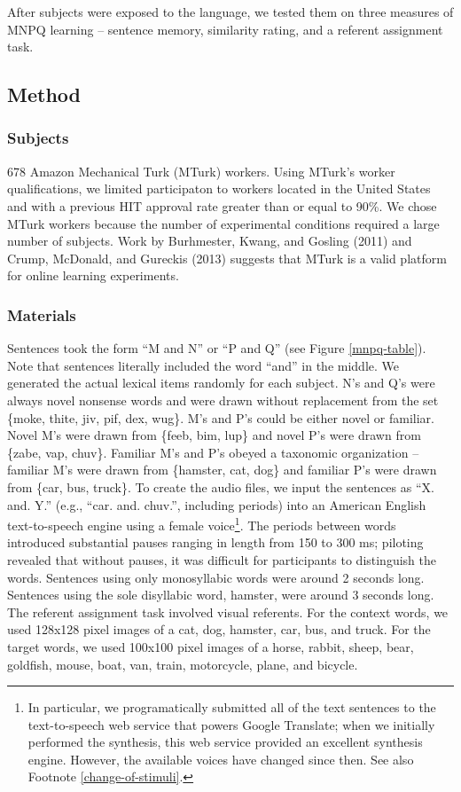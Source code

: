 \documentclass[man,floatsintext]{apa6}
\begin{document}
After subjects were exposed to the language, we tested them on three measures of MNPQ learning -- sentence memory, similarity rating, and a referent assignment task.

\subsection{Method}

\subsubsection{Subjects}
678 Amazon Mechanical Turk (MTurk) workers. Using MTurk's worker qualifications, we limited participaton to workers located in the United States and with a previous HIT approval rate greater than or equal to 90\%. We chose MTurk workers because the number of experimental conditions required a large number of subjects. Work by Burhmester, Kwang, and Gosling (2011) and Crump, McDonald, and Gureckis (2013) suggests that MTurk is a valid platform for online learning experiments.

\subsubsection{Materials}
Sentences took the form ``M and N'' or ``P and Q'' (see Figure \ref{mnpq-table}). Note that sentences literally included the word ``and'' in the middle. We generated the actual lexical items randomly for each subject. N's and Q's were always novel nonsense words and were drawn without replacement from the set \{moke, thite, jiv, pif, dex, wug\}. M's and P's could be either novel or familiar. Novel M's were drawn from \{feeb, bim, lup\} and novel P's were drawn from \{zabe, vap, chuv\}. Familiar M's and P's obeyed a taxonomic organization -- familiar M's were drawn from \{hamster, cat, dog\} and familiar P's were drawn from \{car, bus, truck\}. To create the audio files, we input the sentences as ``X. and. Y.'' (e.g., ``car. and. chuv.'', including periods) into an American English text-to-speech engine using a female voice\footnote{\label{tts}In particular, we programatically submitted all of the text sentences to the text-to-speech web service that powers Google Translate; when we initially performed the synthesis, this web service provided an excellent synthesis engine. However, the available voices have changed since then. See also Footnote \ref{change-of-stimuli}.}. The periods between words introduced substantial pauses ranging in length from 150 to 300 ms; piloting revealed that without pauses, it was difficult for participants to distinguish the words. Sentences using only monosyllabic words were around 2 seconds long. Sentences using the sole disyllabic word, hamster, were around 3 seconds long.
The referent assignment task involved visual referents. For the context words, we used 128x128 pixel images of a cat, dog, hamster, car, bus, and truck. For the target words, we used 100x100 pixel images of a horse, rabbit, sheep, bear, goldfish, mouse, boat, van, train, motorcycle, plane, and bicycle.
\end{document}
